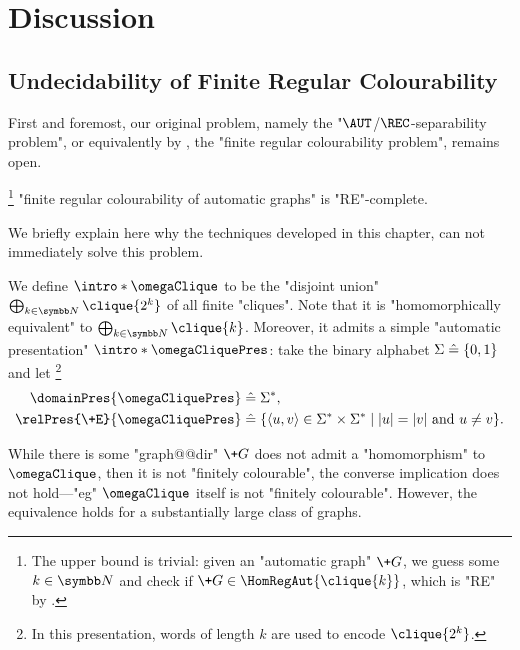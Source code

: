 \section{Discussion}
\label{sec:dichotomy-discussion}

\subsection{Undecidability of Finite Regular Colourability}
\label{sec:undecidability-finite-colourability}

First and foremost, our original problem, namely the "$\AUT$/$\REC$-separability problem",
or equivalently by , the "finite regular colourability problem", remains open. 

\begin{conjecture}%
	\!\footnote{The upper bound is trivial: given an "automatic graph" $\+G$,
	we guess some $k\in \N$ and check if $\+G \in \HomRegAut{\clique{k}}$, which is "RE"
	by .}
	\AP\label{conj:finite-regular-colourability-undecidable}
	"finite regular colourability of automatic graphs" is "RE"-complete.
\end{conjecture}

We briefly explain here why the techniques developed in this chapter,
can not immediately solve this problem. 

We define \AP$\intro*\omegaClique$ to be the "disjoint union" $\bigoplus_{k\in\N} \clique{2^k}$ of all finite "cliques". Note that it is "homomorphically equivalent" to $\bigoplus_{k\in\N} \clique{k}$.
Moreover, it admits a simple "automatic presentation" \AP$\intro*\omegaCliquePres$: take the binary alphabet $\Sigma \mathrel{\hat{=}} \{0,1\}$ and let%
\footnote{In this presentation, words of length $k$ are used to encode $\clique{2^k}$.}
\begin{align*}
	\domainPres{\omegaCliquePres} & \defeq \Sigma^*, \\ 
	\relPres{\+E}{\omegaCliquePres} & \defeq \{\tup{u,v} \in \Sigma^* \times \Sigma^* \mid |u| = |v| \text{ and }
	u \neq v\}.
\end{align*}

While there is some "graph@@dir" $\+G$ does not admit a "homomorphism" to $\omegaClique$, then it is not "finitely colourable", the converse implication does not hold---"eg" $\omegaClique$ itself is not "finitely colourable". However, the equivalence holds for a substantially large class of graphs.

